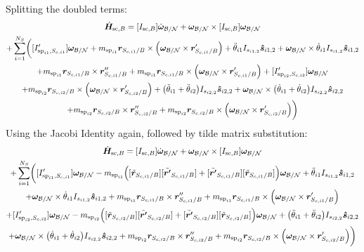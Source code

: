 \documentclass[paper]{aiaaNew}
\begin{document}
	Splitting the doubled terms:
	\begin{multline}
	\dot{\bm{H}}_{\text{sc},B} = [I_{\text{sc},B}]\dot{\bm\omega}_{\cal B/N}	+ \bm\omega_{\cal B/N} \times [I_{\text{sc},B}] \bm\omega_{\cal B/N} \\ 
	+\sum\limits_{i=1}^{N_S} \biggl( [I'_{\text{sp}_{i1},S_{c,i1}}] \bm\omega_{\cal B/N} + m_{\text{sp}_{i1}} \bm{r}_{S_{c,i1}/B} \times \Big( \bm\omega_{\cal B/N} \times \bm{r}'_{S_{c,i1}/B}\Big)
	+ \ddot{\theta}_{i1} I_{s_{i1,2}}\bm{\hat{s}}_{i1,2}+ \bm\omega_{\cal B/N} \times \dot{\theta}_{i1} I_{s_{i1,2}}\bm{\hat{s}}_{i1,2}	\\
	+m_{\text{sp}_{i1}} \bm{r}_{S_{c,i1}/B} \times \bm{r}''_{S_{c,i1}/B}
	+ m_{\text{sp}_{i1}} \bm{r}_{S_{c,i1}/B} \times \Big( \bm\omega_{\cal B/N} \times \bm{r}'_{S_{c,i1}/B}\Big)	+ [I'_{\text{sp}_{i2},S_{c,i2}}] \bm\omega_{\cal B/N} \\
	+ m_{\text{sp}_{i2}} \bm{r}_{S_{c,i2}/B} \times \Big(\bm\omega_{\cal B/N} \times \bm{r}'_{S_{c,i2}/B}\Big)
	+ \big(\ddot{\theta}_{i1} + \ddot{\theta}_{i2}\big) I_{s_{i2,2}}\bm{\hat{s}}_{i2,2} + 
	\bm\omega_{\cal B/N} \times \big(\dot{\theta}_{i1} + \dot{\theta}_{i2}\big) I_{s_{i2,2}}\bm{\hat{s}}_{i2,2}\\
	+m_{\text{sp}_{i2}} \bm{r}_{S_{c,i2}/B} \times \bm{r}''_{S_{c,i2}/B} + m_{\text{sp}_{i2}} \bm{r}_{S_{c,i2}/B} \times \Big(\bm\omega_{\cal B/N} \times \bm{r}'_{S_{c,i2}/B}\Big)\biggr)
	\label{eq:Hbdot19}
	\end{multline}
	Using the Jacobi Identity again, followed by tilde matrix substitution:
	\begin{multline}
	\dot{\bm{H}}_{\text{sc},B} = [I_{\text{sc},B}]\dot{\bm\omega}_{\cal B/N}	+ \bm\omega_{\cal B/N} \times [I_{\text{sc},B}] \bm\omega_{\cal B/N} \\ 
	+\sum\limits_{i=1}^{N_S} \biggl( [I'_{\text{sp}_{i1},S_{c,i1}}] \bm\omega_{\cal B/N}  - m_{\text{sp}_{i1}}\Big([\tilde{\bm{r}}_{S_{c,i1}/B}][\tilde{\bm{r'}}_{S_{c,i1}/B}] + [\tilde{\bm{r'}}_{S_{c,i1}/B}][\tilde{\bm{r}}_{S_{c,i1}/B}]   \Big)\bm\omega_{\cal B/N}	
	+ \ddot{\theta}_{i1} I_{s_{i1,2}}\bm{\hat{s}}_{i1,2}\\
	+ \bm\omega_{\cal B/N} \times \dot{\theta}_{i1} I_{s_{i1,2}}\bm{\hat{s}}_{i1,2}	+m_{\text{sp}_{i1}} \bm{r}_{S_{c,i1}/B} \times \bm{r}''_{S_{c,i1}/B} 
	+ m_{\text{sp}_{i1}} \bm{r}_{S_{c,i1}/B} \times \Big( \bm\omega_{\cal B/N} \times \bm{r}'_{S_{c,i1}/B}\Big)	\\
	+ [I'_{\text{sp}_{i2},S_{c,i2}}] \bm\omega_{\cal B/N}  - m_{\text{sp}_{i2}}\Big([\tilde{\bm{r}}_{S_{c,i2}/B}] [\tilde{\bm{r'}}_{S_{c,i2}/B}] + [\tilde{\bm{r'}}_{S_{c,i2}/B}] [\tilde{\bm{r}}_{S_{c,i2}/B}]                 \Big)  \bm\omega_{\cal B/N}      
	+ \big(\ddot{\theta}_{i1} + \ddot{\theta}_{i2}\big) I_{s_{i2,2}}\bm{\hat{s}}_{i2,2} \\
	+ \bm\omega_{\cal B/N} \times \big(\dot{\theta}_{i1} + \dot{\theta}_{i2}\big) I_{s_{i2,2}}\bm{\hat{s}}_{i2,2}
	+m_{\text{sp}_{i2}} \bm{r}_{S_{c,i2}/B} \times \bm{r}''_{S_{c,i2}/B} + m_{\text{sp}_{i2}} \bm{r}_{S_{c,i2}/B} \times \Big(\bm\omega_{\cal B/N} \times \bm{r}'_{S_{c,i2}/B}\Big)\biggr)
	\label{eq:Hbdot20}
	\end{multline}
\end{document}

